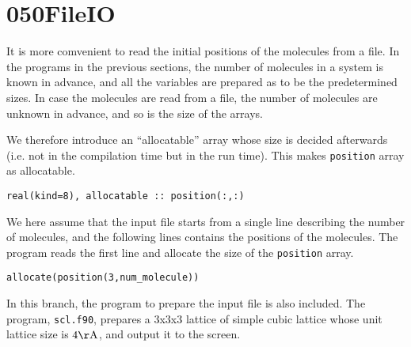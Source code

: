 \documentclass[a4,10pt]{article}
\begin{document}
\section{050FileIO}

It is more comvenient to read the initial positions of the molecules from a file. %
In the programs in the previous sections, the number of molecules in a system is known in advance, and all the variables are prepared as to be the predetermined sizes.  In case the molecules are read from a file, the number of molecules are unknown in advance, and so is the size of the arrays.


We therefore introduce an ``allocatable'' array whose size is decided afterwards (i.e. not in the compilation time but in the run time).
This makes {\tt position} array as allocatable.
\begin{screen}\begin{verbatim}
real(kind=8), allocatable :: position(:,:)
\end{verbatim}\end{screen}

We here assume that the input file starts from a single line describing the number of molecules, and the following lines contains the positions of the molecules.
The program reads the first line and allocate the size of the {\tt position} array.
\begin{screen}\begin{verbatim}
allocate(position(3,num_molecule))
\end{verbatim}\end{screen}

In this branch, the program to prepare the input file is also included.  The program, {\tt scl.f90}, prepares a 3x3x3 lattice of simple cubic lattice whose unit lattice size is $4 {\rm \AA}$, and output it to the screen.
\end{document}

